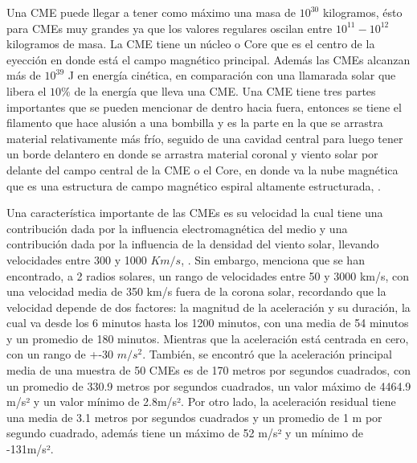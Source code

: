Una \ac{CME} puede llegar a tener como máximo una masa de $10^{30}$ kilogramos, ésto para \acp{CME} muy grandes ya que los valores regulares oscilan entre $10^{11} - 10^{12}$ kilogramos de masa. La \ac{CME} tiene un núcleo o Core que es el centro de la eyección en donde está el campo magnético principal. 
Además las \acp{CME} alcanzan más de $10^{39}$ J en energía cinética, en comparación con una llamarada solar que libera el $10\%$ de la energía que lleva una CME. Una \ac{CME} tiene tres partes importantes que se pueden mencionar de dentro hacia fuera, entonces se tiene el filamento que hace alusión a una bombilla y es la parte en la que se arrastra material relativamente más frío, seguido de una cavidad central para luego tener un borde delantero en donde se arrastra material coronal y viento solar por delante del campo central de la \ac{CME} o el Core, en donde va la nube magnética que es una estructura de campo magnético espiral altamente estructurada, \cite{2014swcm.book.....H}.

Una característica importante de las \acp{CME} es su velocidad la cual tiene una contribución dada por la influencia electromagnética del medio y una contribución dada por la influencia de la densidad del viento solar, llevando velocidades entre 300 y 1000 $Km/s$, \cite{2014swcm.book.....H}. Sin embargo, \cite{zhang-2006} menciona que se han encontrado, a 2 radios solares, un rango de velocidades entre 50 y 3000 km/s, con una velocidad media de 350 km/s fuera de la corona solar, recordando que la velocidad depende de dos factores: la magnitud de la aceleración y su duración, la cual va desde los 6 minutos hasta los 1200 minutos, con una media de 54 minutos y un promedio de 180 minutos. Mientras que la aceleración está centrada en cero, con un rango de +-30 $m/s^{2}$. También, se encontró que la aceleración principal media de una muestra de 50 \acp{CME} es de 170 metros por segundos cuadrados, con un promedio de 330.9 metros por segundos cuadrados, un valor máximo de 4464.9 m/s² y un valor mínimo de 2.8m/s². Por otro lado, la aceleración residual tiene una media de 3.1 metros por segundos cuadrados y un promedio de 1 m por segundo cuadrado, además tiene un máximo de 52 m/s² y un mínimo de -131m/s². 





